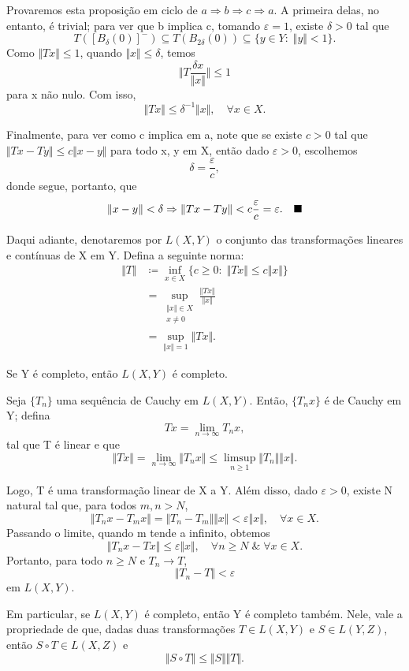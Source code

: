 \documentclass[../functional_analysis.tex]{subfiles}
\begin{document}
\begin{proof*}
	Provaremos esta proposição em ciclo de \(a \Rightarrow b \Rightarrow c \Rightarrow a.\) A primeira delas, no entanto, é trivial; para ver que b implica c, tomando \(\varepsilon =1\), existe \( \delta >0\) tal que
	\[
		T([B_\delta (0)]^{-})\subseteq T(B_{2\delta }(0)) \subseteq \{y\in Y:\; \Vert y \Vert<1\}.
	\]
	Como \(\Vert Tx \Vert\leq 1\), quando \(\Vert x \Vert\leq \delta \), temos
	\[
		\biggl\Vert T \frac{\delta x}{\Vert x \Vert} \biggr\Vert\leq 1
	\]
	para x não nulo. Com isso,
	\[
		\Vert Tx \Vert \leq \delta^{-1}\Vert x \Vert,\quad \forall x\in X.
	\]

	Finalmente, para ver como c implica em a, note que se existe \(c>0\) tal que \(\Vert Tx - Ty \Vert\leq c \Vert x-y \Vert\) para todo x, y em X, então dado \(\varepsilon >0\), escolhemos
	\[
		\delta = \frac{\varepsilon }{c},
	\]
	donde segue, portanto, que
	\[
		\Vert x-y \Vert<\delta  \Rightarrow \Vert Tx - Ty \Vert < c \frac{\varepsilon }{c} = \varepsilon .\quad \text{$\blacksquare$}
	\]
\end{proof*}

\begin{example}
	Daqui adiante, denotaremos por \(L(X, Y)\) o conjunto das transformações lineares e contínuas de X em Y. Defina a seguinte norma:
	\begin{align*}
		\Vert T \Vert & \coloneqq \inf_{x\in X}\{c\geq 0:\; \Vert Tx \Vert\leq c \Vert x \Vert\} \\
		              & = \sup_{\substack{\Vert x \Vert\in X                                     \\ x\neq0}} \frac{\Vert Tx \Vert}{\Vert x \Vert}\\
		              & = \sup_{\Vert x \Vert=1} \Vert Tx \Vert.
	\end{align*}
\end{example}

\begin{prop*}
	Se Y é completo, então \(L(X, Y)\) é completo.
\end{prop*}
\begin{proof*}
	Seja \(\{T_{n}\}\) uma sequência de Cauchy em \(L(X, Y)\). Então, \(\{T_{n}x\}\) é de Cauchy em Y; defina
	\[
		Tx = \lim_{n\to \infty}T_{n}x,
	\]
	tal que T é linear e que
	\[
		\Vert Tx \Vert=\lim_{n\to \infty}\Vert T_{n}x \Vert \leq \limsup_{n\geq 1}\Vert T_{n} \Vert \Vert x \Vert.
	\]

	Logo, T é uma transformação linear de X a Y. Além disso, dado \(\varepsilon >0\), existe N natural tal que, para todos \(m,n>N\),
	\[
		\Vert T_{n}x - T_{m}x \Vert = \Vert T_{n}-T_{m} \Vert \Vert x \Vert < \varepsilon \Vert x \Vert,\quad \forall x\in X.
	\]
	Passando o limite, quando m tende a infinito, obtemos
	\[
		\Vert T_{n}x - Tx \Vert \leq \varepsilon \Vert x \Vert,\quad \forall n\geq N\;\&\; \forall x\in X.
	\]
	Portanto, para todo \(n\geq N\) e \(T_{n}\rightarrow T\),
	\[
		\Vert T_{n}-T \Vert<\varepsilon
	\]
	em \(L(X, Y)\). \qedsymbol
\end{proof*}
Em particular, se \(L(X, Y)\) é completo, então Y é completo também. Nele, vale a propriedade de que, dadas duas transformações \(T\in L(X,Y)\) e \(S\in L(Y, Z)\), então \(S\circ T\in L(X, Z)\) e
\[
	\Vert S\circ T \Vert\leq \Vert S \Vert \Vert T \Vert.
\]
\end{document}
